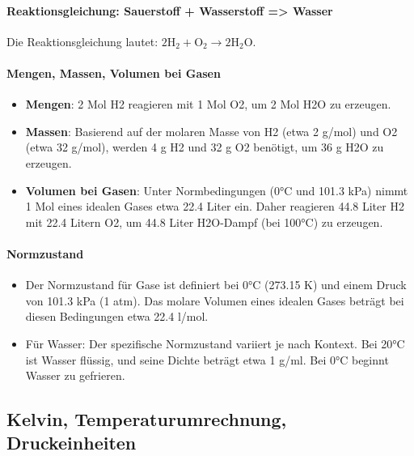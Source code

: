 \documentclass{vorlage-design-main}
\begin{document}
\hypertarget{reaktionsgleichung-sauerstoff-wasserstoff-wasser}{%
\paragraph{Reaktionsgleichung: Sauerstoff + Wasserstoff =\textgreater{}
Wasser}\label{reaktionsgleichung-sauerstoff-wasserstoff-wasser}}

Die Reaktionsgleichung lautet:
$2\text{H}_2 + \text{O}_2 \rightarrow 2\text{H}_2\text{O}$.

\hypertarget{mengen-massen-volumen-bei-gasen}{%
\paragraph{Mengen, Massen, Volumen bei
Gasen}\label{mengen-massen-volumen-bei-gasen}}

\begin{itemize}

\item
  \textbf{Mengen}: 2 Mol H2 reagieren mit 1 Mol O2, um 2 Mol H2O zu
  erzeugen.
\item
  \textbf{Massen}: Basierend auf der molaren Masse von H2 (etwa 2 g/mol)
  und O2 (etwa 32 g/mol), werden 4 g H2 und 32 g O2 benötigt, um 36 g
  H2O zu erzeugen.
\item
  \textbf{Volumen bei Gasen}: Unter Normbedingungen (0°C und 101.3 kPa)
  nimmt 1 Mol eines idealen Gases etwa 22.4 Liter ein. Daher reagieren
  44.8 Liter H2 mit 22.4 Litern O2, um 44.8 Liter H2O-Dampf (bei 100°C)
  zu erzeugen.
\end{itemize}

\hypertarget{normzustand}{%
\paragraph{Normzustand}\label{normzustand}}

\begin{itemize}

\item
  Der Normzustand für Gase ist definiert bei 0°C (273.15 K) und einem
  Druck von 101.3 kPa (1 atm). Das molare Volumen eines idealen Gases
  beträgt bei diesen Bedingungen etwa 22.4 l/mol.
\item
  Für Wasser: Der spezifische Normzustand variiert je nach Kontext. Bei
  20°C ist Wasser flüssig, und seine Dichte beträgt etwa 1 g/ml. Bei 0°C
  beginnt Wasser zu gefrieren.
\end{itemize}

\hypertarget{kelvin-temperaturumrechnung-druckeinheiten}{%
\subsection{Kelvin, Temperaturumrechnung,
Druckeinheiten}\label{kelvin-temperaturumrechnung-druckeinheiten}}
\end{document}
